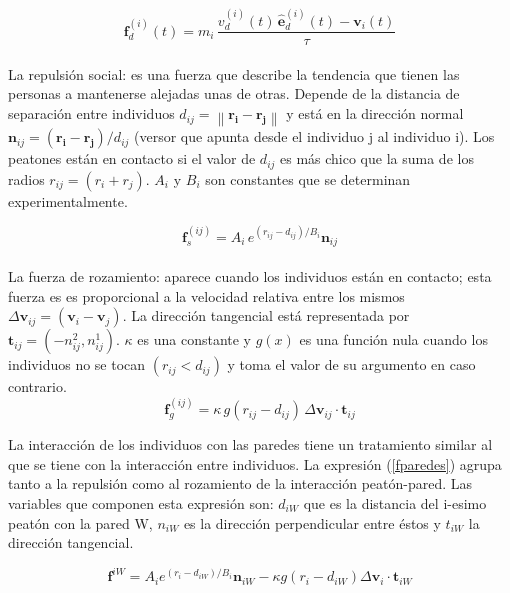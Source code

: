 \begin{equation}
\mathbf{f}_d^ {(i)}(t)=m_i\,\displaystyle\frac{v_d^ {(i)}(t)\,\hat{\mathbf{e}}_d^ {(i)}(t)-\mathbf{v}_i(t)}{\tau}\label{fdeseo}
\end{equation}
\\

La repulsión social: es una fuerza que describe la tendencia que tienen las personas a mantenerse alejadas unas de otras. Depende de la distancia de separación entre individuos $d_{ij}=\left\|\mathbf{r_i}-\mathbf{r_j}\right\|$ y está en la dirección normal $\mathbf{n}_{ij}=(\mathbf{r_i}-\mathbf{r_j})/d_{ij}$ (versor que apunta desde el individuo j al individuo i). Los peatones están en contacto si el valor de $d_{ij}$ es más chico que la suma de los radios $r_{ij}=(r_i+r_j)$. $A_i$ y 	$B_i$ son constantes que se determinan experimentalmente.

\begin{equation}
\mathbf{f}_s^{(ij)}=A_i\,e^{(r_{ij}-d_{ij})/B_i}\mathbf{n}_{ij}\label{fsocial}
\end{equation} 
\\

La fuerza de rozamiento: aparece cuando los individuos están en contacto; esta fuerza es es proporcional a la velocidad relativa entre los mismos $\Delta \mathbf{v}_{ij}=(\mathbf{v}_i-\mathbf{v}_j)$. La dirección tangencial está representada por $\mathbf{t}_{ij}=(-n_{ij}^2,n_{ij}^1)$.  $\kappa$ es una constante y $g(x)$ es una función nula cuando los individuos no se tocan $(r_{ij}<d_{ij})$ y toma el valor de su argumento en caso contrario. 
\begin{equation}
\mathbf{f}_g^{(ij)}=\kappa\,g(r_{ij}-d_{ij})\,\Delta \mathbf{v}_{ij}\cdot\mathbf{t}_{ij}\label{frozamiento}
\end{equation}

La interacción de los individuos con las paredes tiene un tratamiento similar al que se tiene con la interacción entre individuos. La expresión (\ref{fparedes}) agrupa tanto a la repulsión como al rozamiento de la interacción peatón-pared. Las variables que componen esta expresión son: $d_{iW}$ que es la distancia del i-esimo peatón con la pared W, $n_{iW}$ es la dirección perpendicular entre éstos y $t_{iW}$ la dirección tangencial.

\begin{equation}
\mathbf{f}^{iW}=A_ie^{(r_{i}-d_{iW})/B_i}\mathbf{n}_{iW}-\kappa g(r_{i}-d_{iW})\Delta \mathbf{v}_{i}\cdot\mathbf{t}_{iW}
\label{fparedes}
\end{equation} 

